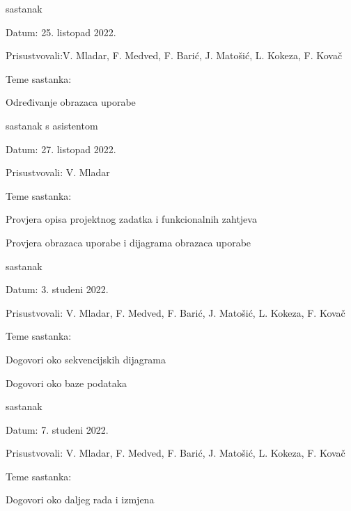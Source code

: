 \begin{packed_enum}
			\item  sastanak
			\item[] \begin{packed_item}
				\item Datum: 25. listopad 2022.
				\item Prisustvovali:V. Mladar, F. Medved, F. Barić, J. Matošić, L. Kokeza, F. Kovač
				\item Teme sastanka:
				\begin{packed_item}
					\item  Određivanje obrazaca uporabe
				\end{packed_item}
			\end{packed_item}
			\bigskip

			\item  sastanak s asistentom
			\item[] \begin{packed_item}
				\item Datum: 27. listopad 2022.
				\item Prisustvovali: V. Mladar
				\item Teme sastanka:
				\begin{packed_item}
					\item  Provjera opisa projektnog zadatka i funkcionalnih zahtjeva
					\item  Provjera obrazaca uporabe i dijagrama obrazaca uporabe
				\end{packed_item}
			\end{packed_item}
			\bigskip

			\item  sastanak
			\item[] \begin{packed_item}
				\item Datum: 3. studeni 2022.
				\item Prisustvovali: V. Mladar, F. Medved, F. Barić, J. Matošić, L. Kokeza, F. Kovač
				\item Teme sastanka:
				\begin{packed_item}
					\item  Dogovori oko sekvencijskih dijagrama
					\item  Dogovori oko baze podataka
				\end{packed_item}
			\end{packed_item}
			\bigskip

			\item  sastanak
			\item[] \begin{packed_item}
				\item Datum: 7. studeni 2022.
				\item Prisustvovali: V. Mladar, F. Medved, F. Barić, J. Matošić, L. Kokeza, F. Kovač
				\item Teme sastanka:
				\begin{packed_item}
					\item  Dogovori oko daljeg rada i izmjena
				\end{packed_item}
			\end{packed_item}
			\bigskip


\end{packed_enum}
